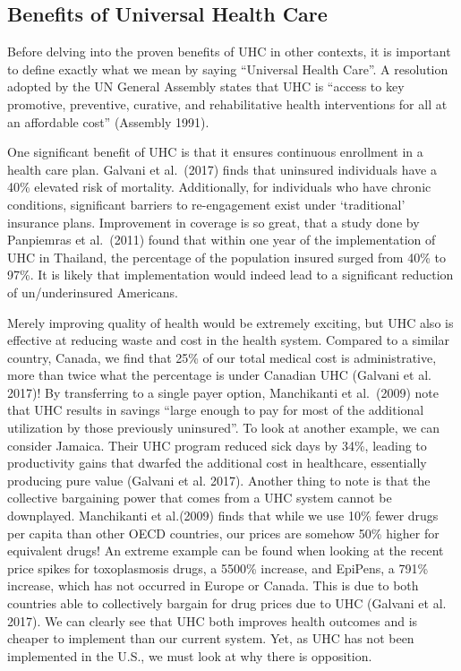 \documentclass[
]{article}
\begin{document}
\hypertarget{benefits-of-universal-health-care}{%
\subsection{Benefits of Universal Health
Care}\label{benefits-of-universal-health-care}}

Before delving into the proven benefits of UHC in other contexts, it is
important to define exactly what we mean by saying ``Universal Health
Care''. A resolution adopted by the UN General Assembly states that UHC
is ``access to key promotive, preventive, curative, and rehabilitative
health interventions for all at an affordable cost'' (Assembly 1991).

One significant benefit of UHC is that it ensures continuous enrollment
in a health care plan. Galvani et al.~(2017) finds that uninsured
individuals have a 40\% elevated risk of mortality. Additionally, for
individuals who have chronic conditions, significant barriers to
re-engagement exist under `traditional' insurance plans. Improvement in
coverage is so great, that a study done by Panpiemras et al.~(2011)
found that within one year of the implementation of UHC in Thailand, the
percentage of the population insured surged from 40\% to 97\%. It is
likely that implementation would indeed lead to a significant reduction
of un/underinsured Americans.

Merely improving quality of health would be extremely exciting, but UHC
also is effective at reducing waste and cost in the health system.
Compared to a similar country, Canada, we find that 25\% of our total
medical cost is administrative, more than twice what the percentage is
under Canadian UHC (Galvani et al. 2017)! By transferring to a single
payer option, Manchikanti et al.~(2009) note that UHC results in savings
``large enough to pay for most of the additional utilization by those
previously uninsured''. To look at another example, we can consider
Jamaica. Their UHC program reduced sick days by 34\%, leading to
productivity gains that dwarfed the additional cost in healthcare,
essentially producing pure value (Galvani et al. 2017). Another thing to
note is that the collective bargaining power that comes from a UHC
system cannot be downplayed. Manchikanti et al.(2009) finds that while
we use 10\% fewer drugs per capita than other OECD countries, our prices
are somehow 50\% higher for equivalent drugs! An extreme example can be
found when looking at the recent price spikes for toxoplasmosis drugs, a
5500\% increase, and EpiPens, a 791\% increase, which has not occurred
in Europe or Canada. This is due to both countries able to collectively
bargain for drug prices due to UHC (Galvani et al. 2017). We can clearly
see that UHC both improves health outcomes and is cheaper to implement
than our current system. Yet, as UHC has not been implemented in the
U.S., we must look at why there is opposition.
\end{document}
